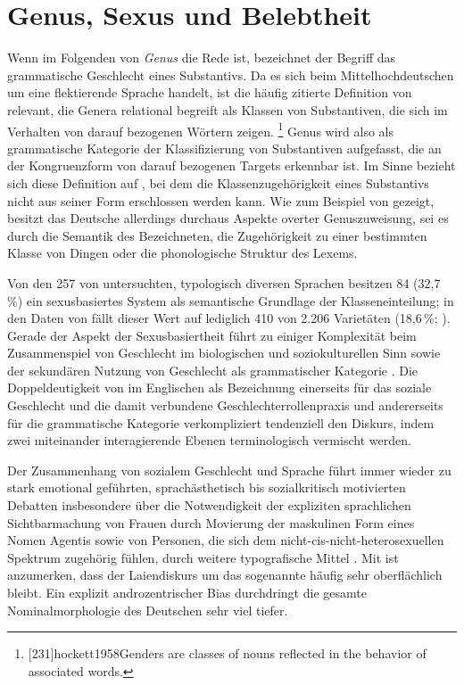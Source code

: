 \section{Genus, Sexus und Belebtheit}
\label{sec:gendsex}

Wenn im Folgenden von \textit{Genus} die Rede ist, bezeichnet der Begriff das
grammatische Geschlecht eines Substantivs. Da es sich beim
Mittelhochdeutschen um eine flektierende Sprache handelt,
ist die häufig zitierte Definition von \citet[231]{hockett1958} relevant, die
Genera relational begreift als Klassen von Substantiven, die sich im Verhalten
von darauf bezogenen Wörtern zeigen.%
%
	\footnote{[231]{hockett1958}{Genders are classes
		of nouns reflected in the behavior of associated words}.}
%
Genus wird also als grammatische Kategorie der Klassifizierung von Substantiven
aufgefasst, die an der Kongruenzform von darauf bezogenen Targets erkennbar
ist. Im Sinne  bezieht sich diese Definition auf
, bei dem die Klassenzugehörigkeit eines Substantivs nicht
aus seiner Form erschlossen werden kann. Wie zum Beispiel von
\citet{koepckezubin2017} gezeigt, besitzt das Deutsche allerdings durchaus
Aspekte overter Genuszuweisung, sei es durch die Semantik des Bezeichneten, die
Zugehörigkeit zu einer bestimmten Klasse von Dingen oder die phonologische
Struktur des Lexems.

Von den 257 von \citet{corbett2013b} untersuchten, typologisch diversen
Sprachen besitzen 84 (32,7\,\%) ein sexusbasiertes System als semantische
Grundlage der Klasseneinteilung; in den Daten von 
\autocite{skirgardetal2023} fällt dieser Wert auf lediglich 410 von 2.206
Varietäten (18,6\,\%; \cite[siehe][]{haynie:gb051}). Gerade der Aspekt der
Sexusbasiertheit führt zu einiger Komplexität beim Zusammenspiel von Geschlecht
im biologischen und soziokulturellen Sinn sowie der sekundären Nutzung von
Geschlecht als grammatischer Kategorie \autocites[dazu
ausführlich][]{kotthoffnuebling2018}{steriopolosteriopolo2022}. Die
Doppeldeutigkeit von  im Englischen als Bezeichnung einerseits für
das soziale Geschlecht und die damit verbundene Geschlechter\-rollen\-praxis
und andererseits für die grammatische Kategorie verkompliziert tendenziell den
Diskurs, indem zwei miteinander interagierende Ebenen terminologisch vermischt
werden.

Der Zusammenhang von sozialem Geschlecht und Sprache führt immer wieder zu
stark emotional geführten, sprachästhetisch bis sozialkritisch motivierten
Debatten insbesondere über die Notwendigkeit der expliziten sprachlichen
Sichtbarmachung von Frauen durch Movierung der maskulinen Form eines Nomen
Agentis sowie von Personen, die sich dem nicht-cis-nicht-heterosexuellen
Spektrum zugehörig fühlen, durch weitere typografische Mittel \autocite[dazu
kritisch resümierend][]{kasper2022}. Mit \citet[61--89]{kotthoffnuebling2018}
ist anzumerken, dass der Laiendiskurs um das sogenannte  häufig
sehr oberflächlich bleibt. Ein explizit andro\-zentrischer Bias durchdringt die
gesamte Nominalmorphologie des Deutschen sehr viel tiefer.

